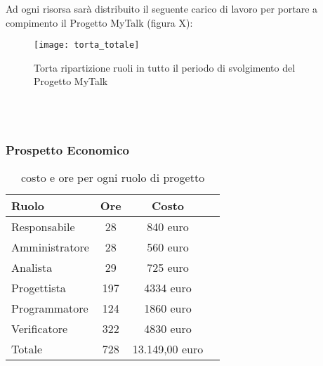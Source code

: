Ad ogni risorsa sarà distribuito il seguente carico di lavoro per portare a compimento il Progetto MyTalk (figura X):\\
\begin{figure}[h]
  \texttt{[image: torta\_totale]}
\caption{Torta ripartizione ruoli in tutto il periodo di svolgimento del Progetto MyTalk}
\end{figure}
\\\\

\subsubsection{Prospetto Economico}

\begin{table}[h]
\centering
\begin{tabular}{|l|c|cl|}
\hline
Ruolo& Ore& Costo& \\
\hline
Responsabile & 28 & 840 euro&\\
Amministratore  & 28& 560 euro&\\
Analista & 29& 725 euro&\\
Progettista  & 197& 4334 euro&\\
Programmatore & 124& 1860 euro&\\
Verificatore & 322 & 4830 euro&\\
\hline
Totale & 728 &13.149,00 euro&\\
\hline
\end{tabular}
\caption{costo e ore per ogni ruolo di progetto}
\end{table}

